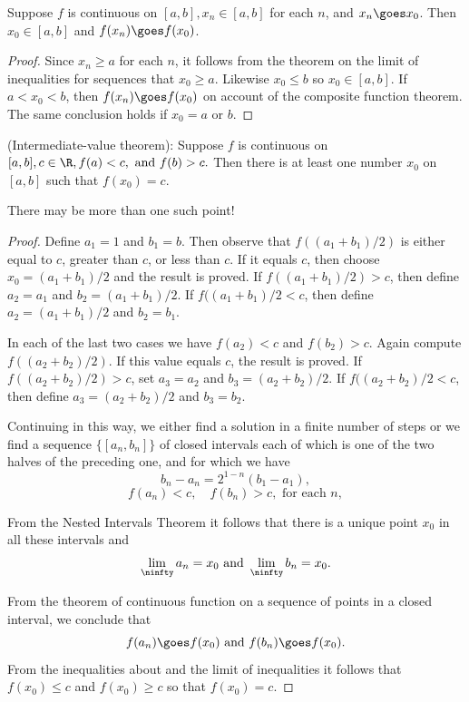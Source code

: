 \begin{theorem}Suppose $f$ is continuous on $[a, b], x_n \in [a, b]$ for each $n$, and $x_n \goes x_0$. Then $x_0 \in [a, b]$ and $f(x_n) \goes f(x_0)$.
\end{theorem}

\begin{proof}
Since $x_n \ge a$ for each $n$, it follows from the theorem on the limit of inequalities for sequences that $x_0 \ge a$. Likewise $x_0\le b$ so $x_0 \in [a, b]$. If $a< x_0 < b$,
then $f(x_n)\goes f(x_0)$ on account of the composite function theorem. The same conclusion holds if $x_0 = a$ or $b$.
\end{proof}

\begin{theorem}{(Intermediate-value theorem)}: Suppose $f$ is continuous on $[a, b], c \in \R, f(a) < c, \mbox{ and } f(b)>c.$ Then there is at least one number $x_0$ on $[a ,b]$ such that $f(x_0)= c$. \end{theorem}

There may be more than one such point!

\begin{proof}
Define $a_1 = 1$ and $b_1 = b$. Then observe that $f((a_1 + b_1)/2)$ is either equal to $c$, greater than $c$, or less than $c$. If it equals $c$, then choose $x_0 = (a_1 + b_1)/2$ and the result is proved. If $f((a_1 + b_1)/2) > c$, then define $a_2 = a_1$ and $b_2 = (a_1 + b_1)/2$. If $f((a_1 + b_1)/2 < c$, then define $a_2 = (a_1 + b_1)/2$ and $b_2 = b_1$.

In each of the last two cases we have $f(a_2) < c$ and $f(b_2) > c$. Again compute $f((a_2 + b_2)/2)$. If this value equals $c$, the result is proved.
If $f((a_2 + b_2)/2) > c$, set $a_3 = a_2$ and $b_3 = (a_2 + b_2)/2$. If $f((a_2 + b_2)/2 < c$, then define $a_3 = (a_2 + b_2)/2$ and $b_3 = b_2$.

Continuing in this way, we either find a solution in a finite number of steps or we find a sequence $\{[a_n, b_n]\}$ of closed intervals each of which is one of the two halves of the preceding one, and for which we have
\[ b_n - a_n = 2^{1-n}(b_1 - a_1),\]
\[f(a_n) < c, \quad f(b_n) > c, \mbox{ for each } n,\]

From the Nested Intervals Theorem it follows that there is a unique point $x_0$ in all these intervals and
\[ \lim_{\ninfty} a_n = x_0\mbox{ and } \lim_{\ninfty} b_n = x_0.\]

From the theorem of continuous function on a sequence of points in a closed interval, we conclude that \[f(a_n) \goes f(x_0) \mbox{ and } f(b_n)\goes f(x_0).\]
From the inequalities about and the limit of inequalities it follows that $f(x_0) \le c$ and $f(x_0) \ge c$ so that $f(x_0) = c$.
\end{proof}
